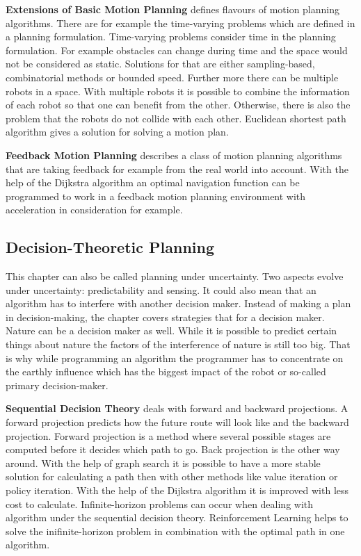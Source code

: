 \textbf{Extensions of Basic Motion Planning} defines flavours of motion planning algorithms. There are for example the time-varying problems which are defined in a planning formulation. Time-varying problems consider time in the planning formulation. For example obstacles can change during time and the space would not be considered as static. Solutions for that are either sampling-based, combinatorial methods or bounded speed. Further more there can be multiple robots in a space. With multiple robots it is possible to combine the information of each robot so that one can benefit from the other. Otherwise, there is also the problem that the robots do not collide with each other. \cite{planning_algorithms_steven_m_lavalle} Euclidean shortest path algorithm gives a solution for solving a motion plan. \cite{efficient_computation_of_euclidean_shortest_paths_in_the_plane}

\textbf{Feedback Motion Planning} describes a class of motion planning algorithms that are taking feedback for example from the real world into account. With the help of the Dijkstra algorithm an optimal navigation function can be programmed to work in a feedback motion planning environment with acceleration in consideration for example. \cite{planning_algorithms_steven_m_lavalle}

\subsection{Decision-Theoretic Planning} \label{sec:Decision-Theoretic Planning}

This chapter can also be called planning under uncertainty. Two aspects evolve under uncertainty: predictability and sensing. It could also mean that an algorithm has to interfere with another decision maker. Instead of making a plan in decision-making, the chapter covers strategies that for a decision maker. Nature can be a decision maker as well. While it is possible to predict certain things about nature the factors of the interference of nature is still too big. That is why while programming an algorithm the programmer has to concentrate on the earthly influence which has the biggest impact of the robot or so-called primary decision-maker. \cite{planning_algorithms_steven_m_lavalle}

\textbf{Sequential Decision Theory} deals with forward and backward projections. A forward projection predicts how the future route will look like and the backward projection. Forward projection is a method where several possible stages are computed before it decides which path to go. Back projection is the other way around. With the help of graph search it is possible to have a more stable solution for calculating a path then with other methods like value iteration or policy iteration. With the help of the Dijkstra algorithm it is improved with less cost to calculate. Infinite-horizon problems can occur when dealing with algorithm under the sequential decision theory. Reinforcement Learning helps to solve the inifinite-horizon problem in combination with the optimal path in one algorithm. \cite{planning_algorithms_steven_m_lavalle}

